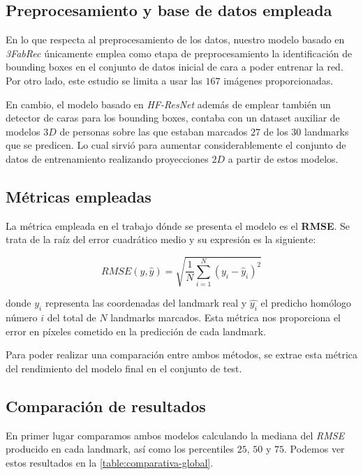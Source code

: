         \subsection{Preprocesamiento y base de datos empleada}
            \noindent En lo que respecta al preprocesamiento de los datos, nuestro modelo basado en \textit{3FabRec} únicamente emplea como etapa de preprocesamiento la identificación de bounding boxes en el conjunto de datos inicial de cara a poder entrenar la red. Por otro lado, este estudio se limita a usar las $167$ imágenes proporcionadas.

            \medskip

            \noindent En cambio, el modelo basado en \textit{HF-ResNet} además de emplear también un detector de caras para los bounding boxes, contaba con un dataset auxiliar de modelos $3D$ de personas sobre las que estaban marcados $27$ de los $30$ landmarks que se predicen. Lo cual sirvió para aumentar considerablemente el conjunto de datos de entrenamiento realizando proyecciones $2D$ a partir de estos modelos.

        \subsection{Métricas empleadas}
            \noindent La métrica empleada en el trabajo dónde se presenta el modelo es el \textbf{RMSE}. Se trata de la raíz del error cuadrático medio y su expresión es la siguiente: 

            \begin{equation*}
                RMSE(y,\widehat{y})= \sqrt{\frac{1}{N} \sum_{i=1}^{N} (y_i-\widehat{y}_i)^2}
            \end{equation*}

            \noindent donde $y_i$ representa las coordenadas del landmark real y $\widehat{y_i}$ el predicho homólogo número $i$ del total de $N$ landmarks marcados. Esta métrica nos proporciona el error en píxeles cometido en la predicción de cada landmark.

            \medskip

            \noindent Para poder realizar una comparación entre ambos métodos, se extrae esta métrica del rendimiento del modelo final en el conjunto de test. 

        \subsection{Comparación de resultados}
            \noindent En primer lugar comparamos ambos modelos calculando la mediana del \textit{RMSE} producido en cada landmark, así como los percentiles $25$, $50$ y $75$. Podemos ver estos resultados en la \autoref{table:comparativa-global}.

